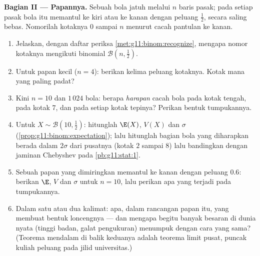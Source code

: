 \begin{problem}
\medskip
\noindent\textbf{Bagian II --- Papannya.}
Sebuah bola jatuh melalui $n$ baris pasak; pada setiap pasak bola itu memantul
ke kiri atau ke kanan dengan peluang $\frac12$, secara saling bebas. Nomorilah
kotaknya $0$ sampai $n$ menurut cacah pantulan ke kanan.
\begin{enumerate}[resume]
  \item Jelaskan, dengan daftar periksa
        \cref{met:g11:binom:recognize}, mengapa nomor kotaknya
        mengikuti  binomial
        $\mathcal B\!\left(n, \frac12\right)$.
  \item Untuk papan kecil ($n = 4$): berikan kelima peluang
        kotaknya. Kotak mana yang paling padat?
  \item Kini $n = 10$ dan $1\,024$ bola: berapa \emph{harapan}
        cacah bola pada kotak tengah, pada kotak
        $7$, dan pada setiap kotak tepinya? Perikan bentuk tumpukannya.
  \item Untuk $X \sim \mathcal B\!\left(10, \frac12\right)$:
        hitunglah $\E(X)$, $V(X)$ dan $\sigma$
        (\cref{prop:g11:binom:expectation}); lalu hitunglah
        bagian bola yang diharapkan berada dalam $2\sigma$ dari
        pusatnya (kotak $2$ sampai $8$) lalu bandingkan dengan jaminan
        Chebyshev pada \cref{pb:g11:stat:1}.
  \item Sebuah papan yang dimiringkan memantul ke kanan dengan peluang $0.6$:
        berikan $\E$, $V$ dan $\sigma$ untuk $n = 10$, lalu perikan
        apa yang terjadi pada tumpukannya.
  \item Dalam satu atau dua kalimat: apa, dalam rancangan papan itu,
        yang membuat bentuk loncengnya --- dan mengapa begitu banyak
        besaran di dunia nyata (tinggi badan, galat pengukuran)
        menumpuk dengan cara yang sama? (Teorema mendalam di balik keduanya
        adalah teorema limit pusat, puncak kuliah peluang pada jilid
        universitas.)
\end{enumerate}


\end{problem}
